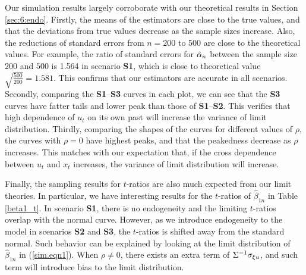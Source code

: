 Our simulation results largely corroborate with our theoretical results in Section \ref{sec:6:endo}. Firstly, the means of the estimators are close to the true values, and that the deviations from true values decrease as the sample sizes increase. Also, the reductions of standard errors from $n = 200$ to 500 are close to the theoretical values. For example, the ratio of standard errors for $\hat{\alpha}_n$ between the sample size $200$ and $500$ is 1.564 in scenario {\bf S1}, which is close to theoretical value $\sqrt{\frac{500}{200}} = 1.581$. This confirms that our estimators are accurate in all scenarios. Secondly, comparing the {\bf S1}--{\bf S3} curves in each plot, we can see that the {\bf S3} curves have fatter tails and lower peak than those of {\bf S1}--{\bf S2}. This verifies that high dependence of $u_t$ on its own past will increase the variance of limit distribution. Thirdly, comparing the shapes of the curves for different values of $\rho$, the curves with $\rho = 0$ have highest peaks, and that the peakedness decrease as $\rho$ increases. This matches with our expectation that, if the cross dependence between $u_t$ and $x_t$ increases, the variance of limit distribution will increase.

Finally, the sampling results for $t$-ratios are also much expected from our limit theories. In particular, we have interesting results for the $t$-ratios of $\hat{\beta}_{1n}$ in Table \ref{beta1_t}. In scenario {\bf S1}, there is no endogeneity and the limiting $t$-ratios overlap with the normal curve. However, as we introduce endogeneity to the model in scenarios {\bf S2} and {\bf S3}, the $t$-ratios is shifted away from the standard normal. Such behavior can be explained by looking at the limit distribution of $\hat{\beta}_{1n}$ in (\ref{sim.eqn1}). When $\rho \ne 0$, there exists an extra term of $ \Sigma^{-1} \sigma_{\xi u}$, and such term will introduce bias to the limit distribution.



